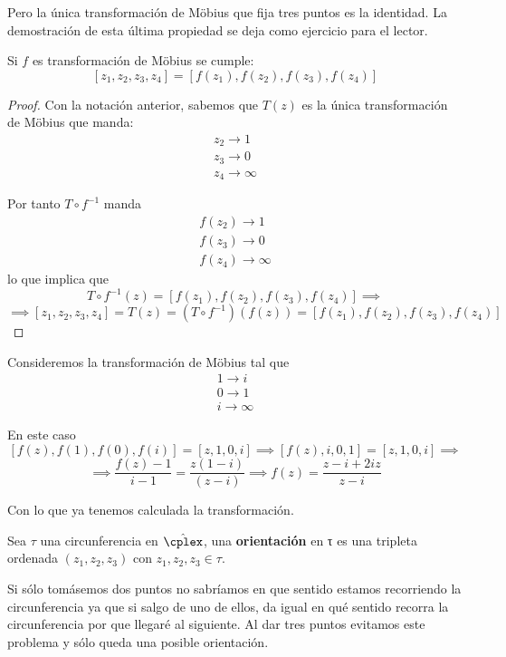 \documentclass{apuntes}
\begin{document}
Pero la única transformación de Möbius que fija tres puntos es la identidad. La demostración de esta última propiedad se deja como ejercicio para el lector.

\begin{lemma}
Si $f$ es transformación de Möbius se cumple:
\[[z_1,z_2,z_3,z_4]=[f(z_1),f(z_2),f(z_3),f(z_4)]\]
\end{lemma}

\begin{proof}
Con la notación anterior, sabemos que $T(z)$ es la única transformación de Möbius que manda:
\begin{align*}
z_2 \to 1\\ z_3 \to 0 \\ z_4 \to \infty
\end{align*}

Por tanto $T\circ f^{-1}$ manda
\begin{align*}
f(z_2) \to 1\\ f(z_3) \to 0 \\ f(z_4) \to \infty
\end{align*}
lo que implica que
\[T\circ f^{-1}(z)=[f(z_1),f(z_2),f(z_3),f(z_4)] \implies \]
\[\implies [z_1,z_2,z_3,z_4] = T(z)=(T \circ f^{-1})(f(z))=[f(z_1),f(z_2),f(z_3),f(z_4)]\]
\end{proof}

\begin{example}
Consideremos la transformación de Möbius tal que
\begin{align*}
1 \to i\\ 0 \to 1 \\ i \to \infty
\end{align*}

En este caso
\[[f(z),f(1),f(0),f(i)]=[z,1,0,i]\implies [f(z),i,0,1]=[z,1,0,i]\implies \]
\[\implies \frac{f(z)-1}{i-1} = \frac{z(1-i)}{(z-i)} \implies f(z)=\frac{z-i+2iz}{z-i}\]

Con lo que ya tenemos calculada la transformación.
\end{example}

\begin{defn}[Orientación]
Sea $τ$ una circunferencia en $\hat{\cplex}$, una \textbf{orientación} en τ es una tripleta ordenada $(z_1,z_2,z_3)$ con $z_1,z_2,z_3 \in τ$.

\obs Si sólo tomásemos dos puntos no sabríamos en que sentido estamos recorriendo la circunferencia ya que si salgo de uno de ellos, da igual en qué sentido recorra la circunferencia por que llegaré al siguiente. Al dar tres puntos evitamos este problema y sólo queda una posible orientación.
\end{defn}
\end{document}
